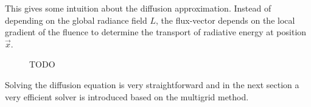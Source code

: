 This gives some intuition about the diffusion approximation. Instead of depending on the global radiance field $L$, the flux-vector depends on the local gradient of the fluence to determine the transport of radiative energy at position $\vec{x}$.
\begin{figure}[h]
\centering
{}
\caption{TODO}
\label{fig:da_moment_problem_flux_as_fluence_gradient}
\end{figure}
Solving the diffusion equation is very straightforward and in the next section a very efficient solver is introduced based on the multigrid method.
